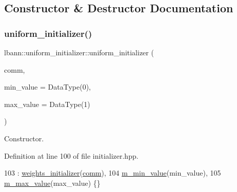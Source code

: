 \subsection{Constructor \& Destructor Documentation}
\mbox{\label{classlbann_1_1uniform__initializer_a97376dcd91f5dfe1d6f2a6aea2c328e4}} 
\subsubsection{\texorpdfstring{uniform\+\_\+initializer()}{uniform\_initializer()}}
{\footnotesize\ttfamily lbann\+::uniform\+\_\+initializer\+::uniform\+\_\+initializer (\begin{DoxyParamCaption}\item[{\hyperlink{classlbann_1_1lbann__comm}{lbann\+\_\+comm} $\ast$}]{comm,  }\item[{Data\+Type}]{min\+\_\+value = {\ttfamily DataType(0)},  }\item[{Data\+Type}]{max\+\_\+value = {\ttfamily DataType(1)} }\end{DoxyParamCaption})\hspace{0.3cm}{\ttfamily [inline]}}

Constructor. 

Definition at line 100 of file initializer.\+hpp.


\begin{DoxyCode}
103     : \hyperlink{classlbann_1_1weights__initializer_a3b65043cb6d76dcfcb07387392429755}{weights\_initializer}(\hyperlink{file__io_8cpp_ab048c6f9fcbcfaa57ce68b00263dbebe}{comm}),
104       \hyperlink{classlbann_1_1uniform__initializer_aa8c380143e8804319b0ee2e277a4969c}{m\_min\_value}(min\_value),
105       \hyperlink{classlbann_1_1uniform__initializer_a208a9e447137f182b5c2141a54c6e6cd}{m\_max\_value}(max\_value) \{\}
\end{DoxyCode}
\mbox{\label{classlbann_1_1uniform__initializer_ad8e07c157466058d6304d8469e34c7e0}} 
